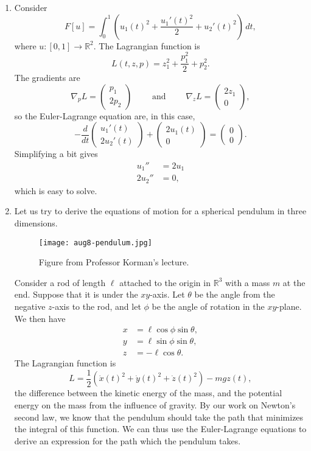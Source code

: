\documentclass[11pt]{article}
\newcommand{\R}{\mathbb{R}}
\begin{document}
\begin{enumerate}
\item
Consider
\[
F[u] = \int_0^1 \left( u_1(t)^2 + \frac{u_1'(t)^2}{2} + u_2'(t)^2 \right) \, dt,
\]
where $u : [0, 1] \to \R^2$. The Lagrangian function is
\[
L(t,z,p) = z_1^2 + \frac{p_1^2}{2} + p_2^2.
\]
The gradients are
\[
\nabla_p L = \begin{pmatrix}
p_1 \\ 2p_2
\end{pmatrix} \qquad \text{ and } \qquad \nabla_z L = \begin{pmatrix}
2z_1 \\ 0
\end{pmatrix},
\]
so the Euler-Lagrange equation are, in this case,
\[
-\frac{d}{dt} \begin{pmatrix}
u_1'(t) \\
2u_2'(t)
\end{pmatrix} + \begin{pmatrix}
2u_1(t) \\ 0
\end{pmatrix} = \begin{pmatrix}
0 \\ 0
\end{pmatrix}.
\]
Simplifying a bit gives
\begin{align*}
u_1'' &= 2u_1 \\
2u_2'' &= 0,
\end{align*}
which is easy to solve.

\item
Let us try to derive the equations of motion for a spherical pendulum in three dimensions.

\begin{figure}[H]
\texttt{[image: aug8-pendulum.jpg]}
\centering
\caption{Figure from Professor Korman's lecture.}
\end{figure}

Consider a rod of length $\ell$ attached to the origin in $\R^3$ with a mass $m$ at the end. Suppose that it is under the $xy$-axis. Let $\theta$ be the angle from the negative $z$-axis to the rod, and let $\phi$ be the angle of rotation in the $xy$-plane. We then have
\begin{align*}
x &= \ell \cos \phi \sin \theta, \\
y  &= \ell \sin \phi \sin \theta, \\
z &= -\ell \cos \theta.
\end{align*}
The Lagrangian function is
\[
L = \frac{1}{2} \left( \dot{x}(t)^2 + \dot{y}(t)^2 + \dot{z}(t)^2 \right) - mgz(t),
\]
the difference between the kinetic energy of the mass, and the potential energy on the mass from the influence of gravity. By our work on Newton's second law, we know that the pendulum should take the path that minimizes the integral of this function. We can thus use the Euler-Lagrange equations to derive an expression for the path which the pendulum takes.


\end{enumerate}
\end{document}
